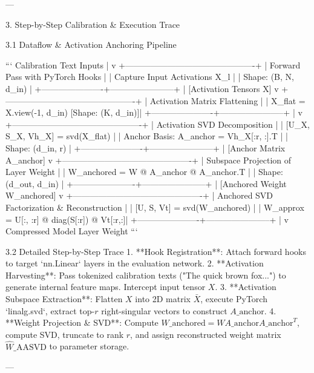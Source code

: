 ---


 3. Step-by-Step Calibration \& Execution Trace


 3.1 Dataflow \& Activation Anchoring Pipeline

```
              Calibration Text Inputs
                         |
                         v
  +----------------------------------------------+
  | Forward Pass with PyTorch Hooks              |
  |   Capture Input Activations X\_l              |
  |   Shape: (B, N, d\_in)                        |
  +----------------------+-----------------------+
                         |  [Activation Tensors X]
                         v
  +----------------------------------------------+
  | Activation Matrix Flattening                 |
  |   X\_flat = X.view(-1, d\_in)  [Shape: (K, d\_in)]|
  +----------------------+-----------------------+
                         |
                         v
  +----------------------------------------------+
  | Activation SVD Decomposition                 |
  |   [U\_X, S\_X, Vh\_X] = svd(X\_flat)             |
  |   Anchor Basis: A\_anchor = Vh\_X[:r, :].T     |
  |   Shape: (d\_in, r)                           |
  +----------------------+-----------------------+
                         |  [Anchor Matrix A\_anchor]
                         v
  +----------------------------------------------+
  | Subspace Projection of Layer Weight          |
  |   W\_anchored = W @ A\_anchor @ A\_anchor.T     |
  |   Shape: (d\_out, d\_in)                       |
  +----------------------+-----------------------+
                         |  [Anchored Weight W\_anchored]
                         v
  +----------------------------------------------+
  | Anchored SVD Factorization \& Reconstruction  |
  |   [U, S, Vt] = svd(W\_anchored)               |
  |   W\_approx = U[:, :r] @ diag(S[:r]) @ Vt[:r,:]|
  +----------------------+-----------------------+
                         |
                         v
              Compressed Model Layer Weight
```

 3.2 Detailed Step-by-Step Trace
1. **Hook Registration**: Attach forward hooks to target `nn.Linear` layers in the evaluation network.
2. **Activation Harvesting**: Pass tokenized calibration texts ("The quick brown fox...") to generate internal feature maps. Intercept input tensor $X$.
3. **Activation Subspace Extraction**: Flatten $X$ into 2D matrix $\bar{X}$, execute PyTorch `linalg.svd`, extract top-$r$ right-singular vectors to construct $A\_{\text{anchor}}$.
4. **Weight Projection \& SVD**: Compute $W\_{\text{anchored}} = W A\_{\text{anchor}} A\_{\text{anchor}}^T$, compute SVD, truncate to rank $r$, and assign reconstructed weight matrix $\hat{W}\_{\text{AASVD}}$ to parameter storage.

---
